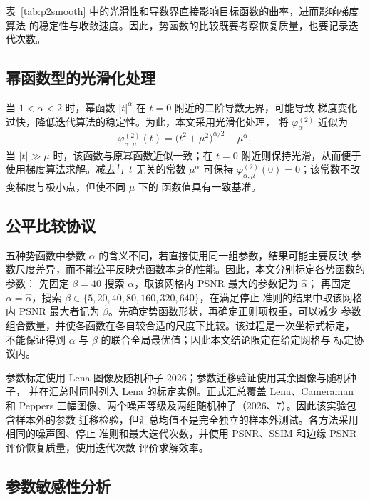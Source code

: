 \documentclass[withoutpreface,bwprint]{cumcmthesis}
\begin{document}
表~\ref{tab:p2smooth} 中的光滑性和导数界直接影响目标函数的曲率，进而影响梯度算法
的稳定性与收敛速度。因此，势函数的比较既要考察恢复质量，也要记录迭代次数。

\subsection{幂函数型的光滑化处理}

当 $1<\alpha<2$ 时，幂函数 $|t|^\alpha$ 在 $t=0$ 附近的二阶导数无界，可能导致
梯度变化过快，降低迭代算法的稳定性。为此，本文采用光滑化处理，
将 $\varphi_{\alpha}^{(2)}$ 近似为
\begin{equation}
  \varphi_{\alpha,\mu}^{(2)}(t)=\big(t^{2}+\mu^{2}\big)^{\alpha/2}-\mu^{\alpha},
\end{equation}
当 $|t|\gg\mu$ 时，该函数与原幂函数近似一致；在 $t=0$ 附近则保持光滑，从而便于
使用梯度算法求解。减去与 $t$ 无关的常数 $\mu^\alpha$ 可保持
$\varphi_{\alpha,\mu}^{(2)}(0)=0$；该常数不改变梯度与极小点，但使不同 $\mu$ 下的
函数值具有一致基准。

\subsection{公平比较协议}

五种势函数中参数 $\alpha$ 的含义不同，若直接使用同一组参数，结果可能主要反映
参数尺度差异，而不能公平反映势函数本身的性能。因此，本文分别标定各势函数的参数：
先固定 $\beta=40$ 搜索 $\alpha$，取该网格内 PSNR 最大的参数记为 $\hat\alpha$；
再固定 $\alpha=\hat\alpha$，搜索 $\beta\in\{5,20,40,80,160,320,640\}$，在满足停止
准则的结果中取该网格内 PSNR 最大者记为 $\hat\beta$。先确定势函数形状，再确定正则项权重，可以减少
参数组合数量，并使各函数在各自较合适的尺度下比较。该过程是一次坐标式标定，
不能保证得到 $\alpha$ 与 $\beta$ 的联合全局最优值；因此本文结论限定在给定网格与
标定协议内。

参数标定使用 Lena 图像及随机种子 2026；参数迁移验证使用其余图像与随机种子，
并在汇总时同时列入 Lena 的标定实例。正式汇总覆盖 Lena、Cameraman 和 Peppers
三幅图像、两个噪声等级及两组随机种子（2026、7）。因此该实验包含样本外的参数
迁移检验，但汇总均值不是完全独立的样本外测试。各方法采用相同的噪声图、停止
准则和最大迭代次数，并使用 PSNR、SSIM 和边缘 PSNR 评价恢复质量，使用迭代次数
评价求解效率。

\subsection{参数敏感性分析}
\end{document}
